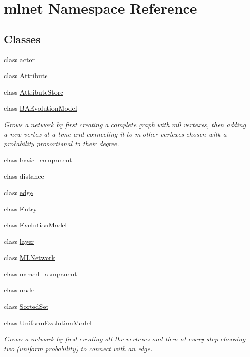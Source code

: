 \hypertarget{namespacemlnet}{\section{mlnet Namespace Reference}
\label{namespacemlnet}
}
\subsection*{Classes}
\begin{DoxyCompactItemize}
\item 
class \hyperlink{classmlnet_1_1actor}{actor}
\item 
class \hyperlink{classmlnet_1_1_attribute}{Attribute}
\item 
class \hyperlink{classmlnet_1_1_attribute_store}{Attribute\+Store}
\item 
class \hyperlink{classmlnet_1_1_b_a_evolution_model}{B\+A\+Evolution\+Model}
\begin{DoxyCompactList}\small\item\em Grows a network by first creating a complete graph with m0 vertexes, then adding a new vertex at a time and connecting it to m other vertexes chosen with a probability proportional to their degree. \end{DoxyCompactList}\item 
class \hyperlink{classmlnet_1_1basic__component}{basic\+\_\+component}
\item 
class \hyperlink{classmlnet_1_1distance}{distance}
\item 
class \hyperlink{classmlnet_1_1edge}{edge}
\item 
class \hyperlink{classmlnet_1_1_entry}{Entry}
\item 
class \hyperlink{classmlnet_1_1_evolution_model}{Evolution\+Model}
\item 
class \hyperlink{classmlnet_1_1layer}{layer}
\item 
class \hyperlink{classmlnet_1_1_m_l_network}{M\+L\+Network}
\item 
class \hyperlink{classmlnet_1_1named__component}{named\+\_\+component}
\item 
class \hyperlink{classmlnet_1_1node}{node}
\item 
class \hyperlink{classmlnet_1_1_sorted_set}{Sorted\+Set}
\item 
class \hyperlink{classmlnet_1_1_uniform_evolution_model}{Uniform\+Evolution\+Model}
\begin{DoxyCompactList}\small\item\em Grows a network by first creating all the vertexes and then at every step choosing two (uniform probability) to connect with an edge. \end{DoxyCompactList}\end{DoxyCompactItemize}

